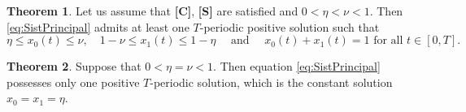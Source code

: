 \documentclass[11pt,reqno]{amsart}
\theoremstyle{definition}
\newtheorem{Theorem}{Theorem}
\begin{document}
\begin{Theorem}\label{TeoP}   Let us assume that  \textbf{[C]},    \textbf{[S]}  are satisfied and $0<\eta<\nu<1$.  Then  \eqref{eq:SistPrincipal} admits at least one $T$-periodic positive solution  such that\begin{equation*}
     \eta\leq x_0(t)\leq \nu,\quad 1-\nu\leq x_1(t)\leq1-\eta \quad \mbox{ and } \quad x_0(t)+x_1(t)=1 \mbox{ for all }t\in[0,T].
\end{equation*}
\end{Theorem}

\begin{Theorem}\label{TeoS}  Suppose that $0<\eta=\nu<1$. Then equation  \eqref{eq:SistPrincipal} possesses only one positive $T$-periodic solution, which is the constant solution $x_0=x_1=\eta$. 
\end{Theorem}
\end{document}
